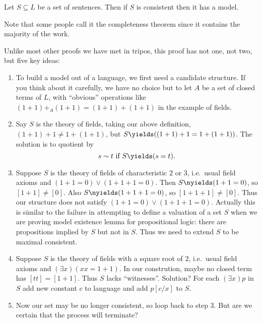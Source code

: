 \documentclass[a4paper]{article}
\begin{document}
\begin{theorem}
  Let \(S \subseteq L\) be a set of sentences. Then if \(S\) is consistent then it has a model.
\end{theorem}

Note that some people call it the completeness theorem since it contains the majority of the work.

Unlike most other proofs we have met in tripos, this proof has not one, not two, but five key ideas:
\begin{enumerate}
\item To build a model out of a language, we first need a candidate structure. If you think about it carefully, we have no choice but to let \(A\) be a set of closed terms of \(L\), with ``obvious'' operations like \((1 + 1) +_A (1 + 1) = (1 + 1) + (1 + 1)\) in the example of fields.
\item Say \(S\) is the theory of fields, taking our above definition, \((1 + 1) + 1 \neq 1 + (1 + 1)\), but \(S \yields ((1 + 1) + 1 = 1 + (1 + 1))\). The solution is to quotient by
  \[
    s \sim t \text{ if } S \yields (s = t).
  \]
\item Suppose \(S\) is the theory of fields of characteristic \(2\) or \(3\), i.e.\ usual field axioms and \((1 + 1 = 0) \lor (1 + 1 + 1 = 0)\). Then \(S \nyields (1 + 1 = 0)\), so \([1 + 1] \neq [0]\). Also \(S \nyields (1 + 1 + 1 = 0)\), so \([1 + 1 + 1] \neq [0]\). Thus our structure does not satisfy \((1 + 1 = 0) \lor (1 + 1 + 1 = 0)\). Actually this is similar to the failure in attempting to define a valuation of a set \(S\) when we are proving model existence lemma for propositional logic: there are propositions implied by \(S\) but not in \(S\). Thus we need to extend \(S\) to be maximal consistent.
\item Suppose \(S\) is the theory of fields with a square root of \(2\), i.e.\ usual field axioms and \((\exists x) (xx = 1 + 1)\). In our constrution, maybe no closed term has \([tt] = [1 + 1]\). Thus \(S\) lacks ``witnesses''. Solution? For each \((\exists x) p\) in \(S\) add new constant \(c\) to language and add \(p[c/x]\) to \(S\).
\item Now our set may be no longer consistent, so loop back to step 3. But are we certain that the process will terminate?
\end{enumerate}
\end{document}
